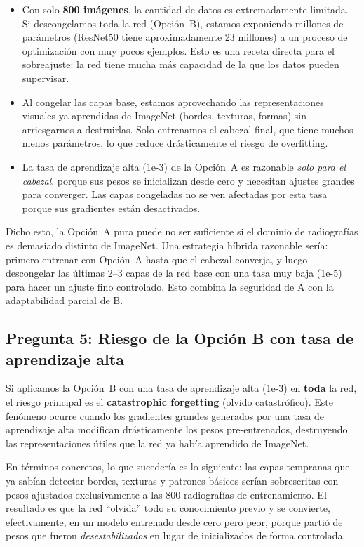 \documentclass[12pt, letterpaper]{article}
\begin{document}
\begin{itemize}[leftmargin=1.5cm]
    \item Con solo \textbf{800 imágenes}, la cantidad de datos es extremadamente limitada.
    Si descongelamos toda la red (Opción~B), estamos exponiendo millones de parámetros
    (ResNet50 tiene aproximadamente 23 millones) a un proceso de optimización con muy pocos
    ejemplos. Esto es una receta directa para el sobreajuste: la red tiene mucha más capacidad
    de la que los datos pueden supervisar.

    \item Al congelar las capas base, estamos aprovechando las representaciones visuales ya
    aprendidas de ImageNet (bordes, texturas, formas) sin arriesgarnos a destruirlas. Solo
    entrenamos el cabezal final, que tiene muchos menos parámetros, lo que reduce drásticamente
    el riesgo de overfitting.

    \item La tasa de aprendizaje alta (1e-3) de la Opción~A es razonable \textit{solo para el
    cabezal}, porque sus pesos se inicializan desde cero y necesitan ajustes grandes para
    converger. Las capas congeladas no se ven afectadas por esta tasa porque sus gradientes
    están desactivados.
\end{itemize}

Dicho esto, la Opción~A pura puede no ser suficiente si el dominio de radiografías es
demasiado distinto de ImageNet. Una estrategia híbrida razonable sería: primero entrenar con
Opción~A hasta que el cabezal converja, y luego descongelar las últimas 2--3 capas de la red
base con una tasa muy baja (1e-5) para hacer un ajuste fino controlado. Esto combina la
seguridad de A con la adaptabilidad parcial de B.

\subsection{Pregunta 5: Riesgo de la Opción B con tasa de aprendizaje alta}

Si aplicamos la Opción~B con una tasa de aprendizaje alta (1e-3) en \textbf{toda} la red, el
riesgo principal es el \textbf{catastrophic forgetting} (olvido catastrófico). Este fenómeno
ocurre cuando los gradientes grandes generados por una tasa de aprendizaje alta modifican
drásticamente los pesos pre-entrenados, destruyendo las representaciones útiles que la red ya
había aprendido de ImageNet.

En términos concretos, lo que sucedería es lo siguiente: las capas tempranas que ya sabían
detectar bordes, texturas y patrones básicos serían sobrescritas con pesos ajustados
exclusivamente a las 800 radiografías de entrenamiento. El resultado es que la red ``olvida''
todo su conocimiento previo y se convierte, efectivamente, en un modelo entrenado desde cero
pero peor, porque partió de pesos que fueron \textit{desestabilizados} en lugar de
inicializados de forma controlada.
\end{document}

